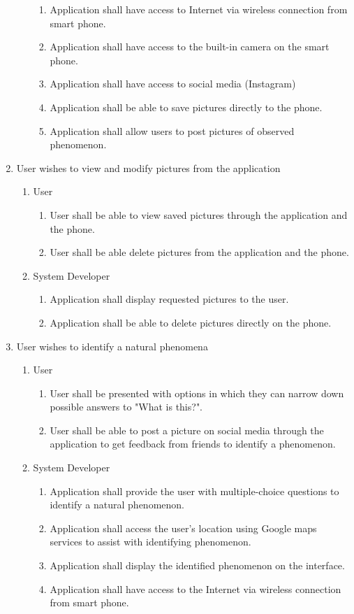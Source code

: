 \documentclass[]{article}
\begin{document}
\begin{enumerate}[{BE}1.]
\begin{enumerate}[{VP2}.1]
\begin{enumerate}
				\item Application shall have access to Internet via wireless connection from smart phone.
				\item Application shall have access to the built-in camera on the smart phone.
				\item Application shall have access to social media (Instagram)
				\item Application shall be able to save pictures directly to the phone.
				\item Application shall allow users to post pictures of observed phenomenon.
			\end{enumerate}
	\end{enumerate}
	\item User wishes to view and modify pictures from the application
	\begin{enumerate} [{VP3}.1]
		\item User
			\begin{enumerate}
				\item User shall be able to view saved pictures through the application and the phone.
				\item User shall be able delete pictures from the application and the phone.
			\end{enumerate}
		\item System Developer
			\begin{enumerate}
				\item Application shall display requested pictures to the user.
				\item Application shall be able to delete pictures directly on the phone.
			\end{enumerate}
	\end{enumerate}
	\item User wishes to identify a natural phenomena
	\begin{enumerate}[{VP4}.1]
		\item User
			\begin{enumerate}
				\item User shall be presented with options in which they can narrow down possible answers to "What is this?".
				\item User shall be able to post a picture on social media through the application to get feedback from friends to identify a phenomenon.
								
			\end{enumerate}
		\item System Developer
			\begin{enumerate}
				\item Application shall provide the user with multiple-choice questions to identify a natural phenomenon.
				\item Application shall access the user's location using Google maps services to assist with identifying phenomenon.
				\item Application shall display the identified phenomenon on the interface.
				\item Application shall have access to the Internet via wireless connection from smart phone.
				 

\end{enumerate}
\end{enumerate}
\end{enumerate}
\end{document}
